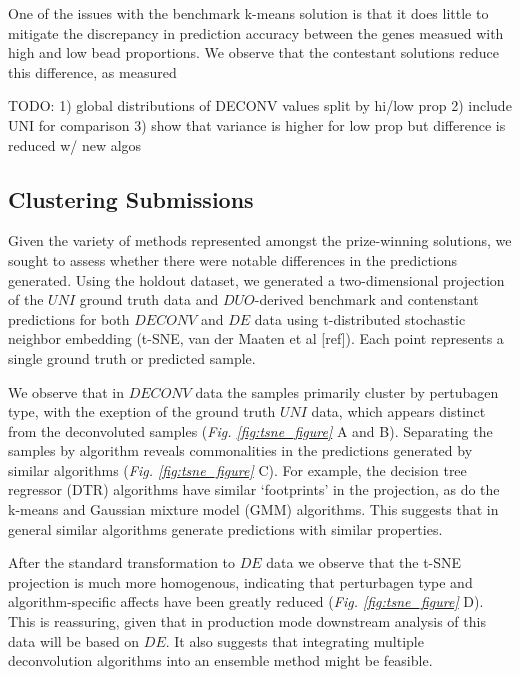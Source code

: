\documentclass[]{article}
\begin{document}
One of the issues with the benchmark k-means solution is that it does
little to mitigate the discrepancy in prediction accuracy between the
genes measued with high and low bead proportions. We observe that the
contestant solutions reduce this difference, as measured

\color{red}

TODO: 1) global distributions of DECONV values split by hi/low prop 2)
include UNI for comparison 3) show that variance is higher for low prop
but difference is reduced w/ new algos

\color{black}

\hypertarget{clustering-submissions}{%
\subsection{Clustering Submissions}\label{clustering-submissions}}

Given the variety of methods represented amongst the prize-winning
solutions, we sought to assess whether there were notable differences in
the predictions generated. Using the holdout dataset, we generated a
two-dimensional projection of the \(UNI\) ground truth data and
\(DUO\)-derived benchmark and contenstant predictions for both
\(DECONV\) and \(DE\) data using t-distributed stochastic neighbor
embedding (t-SNE, van der Maaten et al {[}ref{]}). Each point represents
a single ground truth or predicted sample.

We observe that in \(DECONV\) data the samples primarily cluster by
pertubagen type, with the exeption of the ground truth \(UNI\) data,
which appears distinct from the deconvoluted samples
({\it Fig. \ref{fig:tsne_figure}} A and B). Separating the samples by
algorithm reveals commonalities in the predictions generated by similar
algorithms ({\it Fig. \ref{fig:tsne_figure}} C). For example, the
decision tree regressor (DTR) algorithms have similar `footprints' in
the projection, as do the k-means and Gaussian mixture model (GMM)
algorithms. This suggests that in general similar algorithms generate
predictions with similar properties.

After the standard transformation to \(DE\) data we observe that the
t-SNE projection is much more homogenous, indicating that perturbagen
type and algorithm-specific affects have been greatly reduced
({\it Fig. \ref{fig:tsne_figure}} D). This is reassuring, given that in
production mode downstream analysis of this data will be based on
\(DE\). It also suggests that integrating multiple deconvolution
algorithms into an ensemble method might be feasible.
\end{document}
